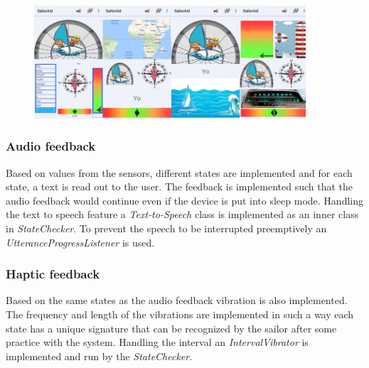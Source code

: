 \begin{figure}[H]
\centering
\includegraphics[width=0.9\textwidth]{Figures/layouts.jpg}
\label{feedback-layouts}
\end{figure}

\subsubsection{Audio feedback}
Based on values from the sensors, different states are implemented and for each state, a text is read out to the user. The feedback is implemented such that the audio feedback would continue even if the device is put into sleep mode. Handling the text to speech feature a \emph{Text-to-Speech}\cite{texttospeech} class is implemented as an inner class in \emph{StateChecker}. To prevent the speech to be interrupted preemptively an \emph{UtteranceProgressListener}\cite{utter} is used. 

\subsubsection{Haptic feedback}
Based on the same states as the audio feedback vibration is also implemented. The frequency and length of the vibrations are implemented in such a way each state has a unique signature that can be recognized by the sailor after some practice with the system. Handling the interval an \emph{IntervalVibrator} is implemented and run by the \emph{StateChecker}.

